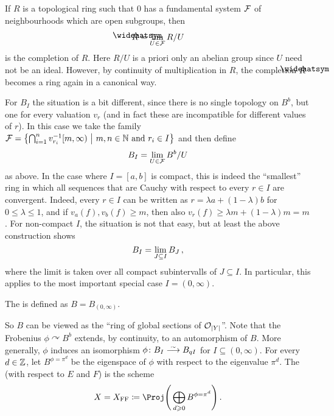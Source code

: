 \begin{rem}
	If $R$ is a topological ring such that $0$ has a fundamental system $\mathcal{F}$ of neighbourhoods which are open subgroups, then
	\begin{equation*}
		\roof{R}=\limit_{U\in\Ff}R/U
	\end{equation*}
	is the completion of $R$. Here $R/U$ is a priori only an abelian group since $U$ need not be an ideal. However, by continuity of multiplication in $R$, the completion $\roof{R}$ becomes a ring again in a canonical way.
	
	For $B_I$ the situation is a bit different, since there is no single topology on $B^b$, but one for every valuation $v_r$ (and in fact these are incompatible for different values of $r$).  In this case we take the family $\mathcal{F}=\left\{\bigcap_{i=1}^nv_{r_i}^{-1}[m,\infty)\ \middle|\  m,n\in\mathbb{N}\text{ and }r_i\in I\right\}$ and then define
	\begin{equation*}
		B_I=\operatorname*{lim}_{U\in \mathcal{F}}B^b/U
	\end{equation*}
	as above. In the case where $I=[a,b]$ is compact, this is indeed the \enquote{smallest} ring in which all sequences that are Cauchy with respect to every $r\in I$ are convergent. Indeed, every $r\in I$ can be written as $r=\lambda a+(1-\lambda)b$ for $0\leq \lambda\leq 1$, and if $v_a(f),v_b(f)\geq m$, then also $v_r(f)\geq \lambda m+(1-\lambda)m=m$. For non-compact $I$, the situation is not that easy, but at least the above construction shows
	\begin{equation*}
		B_I=\operatorname*{lim}_{J\subseteq I}B_J\,,
	\end{equation*}
	where the limit is taken over all compact subintervalls of $J\subseteq I$. In particular, this applies to the most important special case $I=(0,\infty)$.
\end{rem}
\begin{defi}
	The  is defined as $B=B_{(0,\infty)}$.
\end{defi}
So $B$ can be viewed as the \enquote{ring of global sections of $\mathcal{O}_{|Y|}$}. Note that the Frobenius $\phi\curvearrowright B^b$ extends, by continuity, to an automorphism of $B$. More generally, $\phi$ induces an isomorphism $\phi\colon B_I\isomorphism B_{qI}$ for $I\subseteq (0,\infty)$. For every $d\in\mathbb{Z}$, let $B^{\phi=\pi^d}$ be the eigenspace of $\phi$ with respect to the eigenvalue $\pi^d$.
\label{def:FFC}
The  (with respect to $E$ and $F$) is the scheme
\begin{equation*}
	X=X_\FFC\coloneqq \Proj\Bigg(\bigoplus_{d\geq 0}B^{\phi=\pi^d}\Bigg)\,.
\end{equation*}
